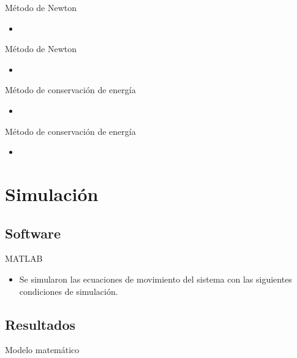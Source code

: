 \documentclass{beamer}
\begin{document}
\begin{frame}{Método de Newton}

\begin{itemize}
 \item 
\end{itemize}

\end{frame}

\begin{frame}{Método de Newton}
\begin{itemize}
 \item 
\end{itemize}
\end{frame}

\begin{frame}{Método de conservación de energía}
 \begin{itemize}
  \item   
 \end{itemize}
\end{frame}


\begin{frame}{Método de conservación de energía}
\begin{itemize}
 \item
\end{itemize}
\end{frame}


\section{Simulación}
\subsection{Software}
\begin{frame}{MATLAB}
 \begin{itemize}
  \item Se simularon las ecuaciones de movimiento del sistema con las siguientes condiciones de simulación.
 \end{itemize}

\end{frame}


\subsection{Resultados}

\begin{frame}{Modelo matemático}
 
\end{frame}
\end{document}
